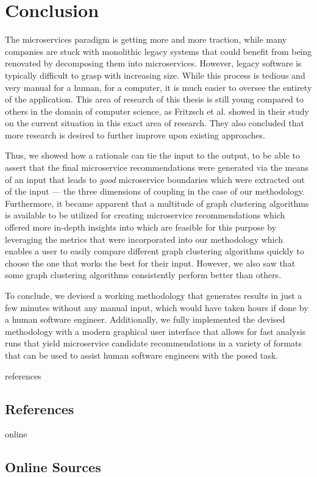 \documentclass[12pt,a4paper]{report}
\begin{document}
\chapter{Conclusion} \label{chap:conclusion}

The microservices paradigm is getting more and more traction, while many
companies are stuck with monolithic legacy systems that could benefit from
being renovated by decomposing them into microservices. However, legacy
software is typically difficult to grasp with increasing size. While this
process is tedious and very manual for a human, for a computer, it is much
easier to oversee the entirety of the application. This area of research of
this thesis is still young compared to others in the domain of computer
science, as Fritzsch et al. showed in their study on the current situation in
this exact area of research. They also concluded that more research is desired
to further improve upon existing approaches.

Thus, we showed how a rationale can tie the input to the output, to be able to
assert that the final microservice recommendations were generated via the means
of an input that leads to \textit{good} microservice boundaries which were
extracted out of the input --- the three dimensions of coupling in the case of
our methodology. Furthermore, it became apparent that a multitude of graph
clustering algorithms is available to be utilized for creating microservice
recommendations which offered more in-depth insights into which are feasible
for this purpose by leveraging the metrics that were incorporated into our
methodology which enables a user to easily compare different graph clustering
algorithms quickly to choose the one that works the best for their input.
However, we also saw that some graph clustering algorithms consistently perform
better than others.

To conclude, we devised a working methodology that generates results in just a
few minutes without any manual input, which would have taken hours if done by a
human software engineer. Additionally, we fully implemented the devised
methodology with a modern graphical user interface that allows for fast
analysis runs that yield microservice candidate recommendations in a variety of
formats that can be used to assist human software engineers with the posed task.




\newpage
{}
\listoffigures
\newpage
{}
\listoftables
\newpage
{}

\begin{btSect}{references}
\section*{\huge{References}}
\btPrintCited
\end{btSect}
\begin{btSect}{online}
\section*{\huge{Online Sources}}
\btPrintCited
\end{btSect}
\end{document}
